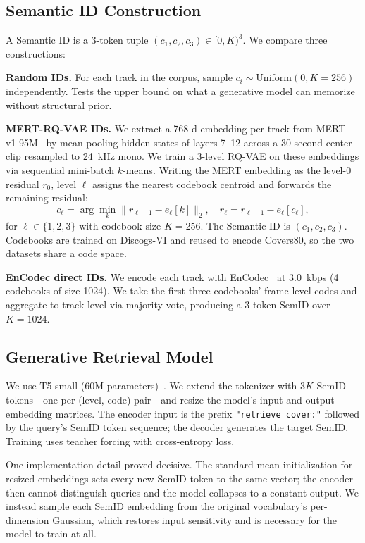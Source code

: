 \documentclass[conference]{IEEEtran}
\begin{document}
\subsection{Semantic ID Construction}
A Semantic ID is a 3-token tuple $(c_1, c_2, c_3) \in [0, K)^3$. We compare three constructions:

\textbf{Random IDs.} For each track in the corpus, sample $c_i \sim \mathrm{Uniform}(0, K{=}256)$ independently. Tests the upper bound on what a generative model can memorize without structural prior.

\textbf{MERT-RQ-VAE IDs.} We extract a 768-d embedding per track from MERT-v1-95M~\cite{yuan2023mert} by mean-pooling hidden states of layers 7--12 across a 30-second center clip resampled to 24~kHz mono. We train a 3-level RQ-VAE on these embeddings via sequential mini-batch $k$-means. Writing the MERT embedding as the level-0 residual $r_0$, level $\ell$ assigns the nearest codebook centroid and forwards the remaining residual:
\begin{equation}
c_\ell = \arg\min_k \lVert r_{\ell-1} - e_\ell[k] \rVert_2, \quad
r_\ell = r_{\ell-1} - e_\ell[c_\ell],
\label{eq:rqvae}
\end{equation}
for $\ell \in \{1,2,3\}$ with codebook size $K=256$. The Semantic ID is $(c_1, c_2, c_3)$. Codebooks are trained on Discogs-VI and reused to encode Covers80, so the two datasets share a code space.

\textbf{EnCodec direct IDs.} We encode each track with EnCodec~\cite{defossez2022encodec} at 3.0~kbps (4 codebooks of size 1024). We take the first three codebooks' frame-level codes and aggregate to track level via majority vote, producing a 3-token SemID over $K=1024$.

\subsection{Generative Retrieval Model}
We use T5-small (60M parameters)~\cite{raffel2020t5}. We extend the tokenizer with $3K$ SemID tokens---one per (level, code) pair---and resize the model's input and output embedding matrices. The encoder input is the prefix \texttt{"retrieve cover:"} followed by the query's SemID token sequence; the decoder generates the target SemID. Training uses teacher forcing with cross-entropy loss.

One implementation detail proved decisive. The standard mean-initialization for resized embeddings sets every new SemID token to the same vector; the encoder then cannot distinguish queries and the model collapses to a constant output. We instead sample each SemID embedding from the original vocabulary's per-dimension Gaussian, which restores input sensitivity and is necessary for the model to train at all.
\end{document}

